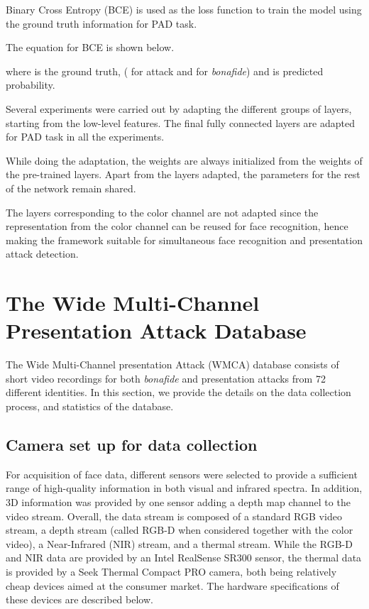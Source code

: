 \documentclass[journal]{IEEEtran}
\begin{document}
Binary Cross Entropy (BCE) is used as the loss function to train the model using the ground truth information for PAD task.

The equation for BCE is shown below.

where  is the ground truth, ( for attack and  for \textit{bonafide}) and  is predicted probability.

Several experiments were carried out by adapting the different groups of layers, starting from the low-level features. The final fully connected layers are adapted for PAD task in all the experiments.

While doing the adaptation, the weights are always initialized from the weights of the pre-trained layers. Apart from the layers adapted, the parameters for the rest of the network remain shared.

The layers corresponding to the color channel are not adapted since the representation from the color channel can be reused for face recognition, hence making the framework suitable for simultaneous face recognition and presentation attack detection.

\section{The Wide Multi-Channel Presentation Attack Database}

The Wide Multi-Channel presentation Attack (WMCA) database consists of short video recordings for both  \textit{bonafide} and presentation attacks from 72 different identities. In this section, we provide the details on the data collection process, and statistics of the database.

\subsection{Camera set up for data collection}

For acquisition of face data, different sensors were selected to provide a sufficient range of high-quality information in both visual and infrared spectra. In addition, 3D information was provided by one sensor adding a depth map channel to the video stream. Overall, the data stream is composed of a standard RGB video stream, a depth stream (called RGB-D when considered together with the color video), a Near-Infrared (NIR) stream, and a thermal stream. While the RGB-D and NIR data are provided by an Intel RealSense SR300 sensor, the thermal data is provided by a Seek Thermal Compact PRO camera, both being relatively cheap devices aimed at the consumer market. The hardware specifications of these devices are described below.
\end{document}
